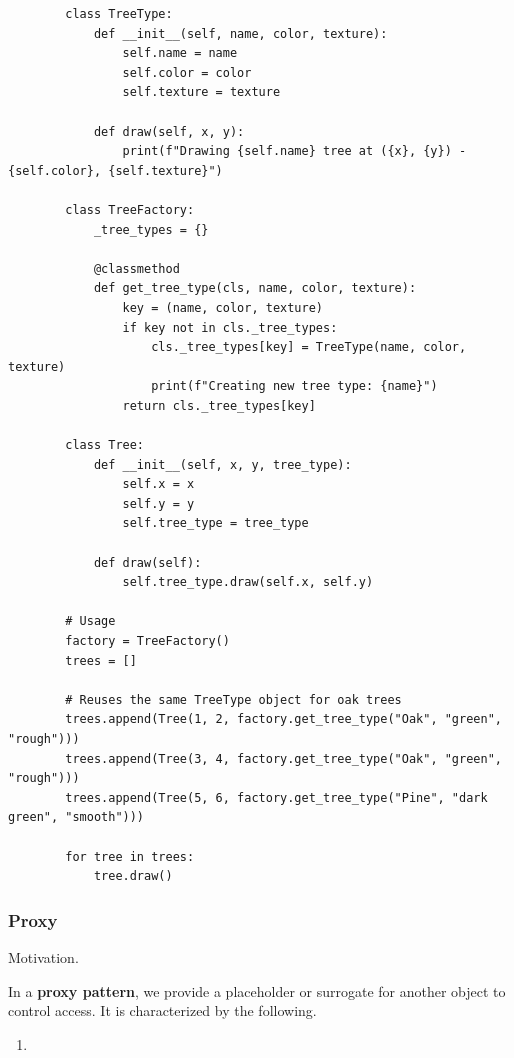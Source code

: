     \begin{example}
      \label{ex:case-study-6}
      \begin{lstlisting}
        class TreeType:
            def __init__(self, name, color, texture):
                self.name = name
                self.color = color
                self.texture = texture
            
            def draw(self, x, y):
                print(f"Drawing {self.name} tree at ({x}, {y}) - {self.color}, {self.texture}")

        class TreeFactory:
            _tree_types = {}
            
            @classmethod
            def get_tree_type(cls, name, color, texture):
                key = (name, color, texture)
                if key not in cls._tree_types:
                    cls._tree_types[key] = TreeType(name, color, texture)
                    print(f"Creating new tree type: {name}")
                return cls._tree_types[key]

        class Tree:
            def __init__(self, x, y, tree_type):
                self.x = x
                self.y = y
                self.tree_type = tree_type
            
            def draw(self):
                self.tree_type.draw(self.x, self.y)

        # Usage
        factory = TreeFactory()
        trees = []

        # Reuses the same TreeType object for oak trees
        trees.append(Tree(1, 2, factory.get_tree_type("Oak", "green", "rough")))
        trees.append(Tree(3, 4, factory.get_tree_type("Oak", "green", "rough")))
        trees.append(Tree(5, 6, factory.get_tree_type("Pine", "dark green", "smooth")))

        for tree in trees:
            tree.draw() 
      \end{lstlisting}
    \end{example}

  \subsubsection{Proxy}

    Motivation. 

    \begin{definition}
      \label{def:proxy-pattern}
      In a \textbf{proxy pattern}, we provide a placeholder or surrogate for another object to control access. It is characterized by the following. 
      \begin{enumerate}
        \item 
      \end{enumerate}
    \end{definition}

